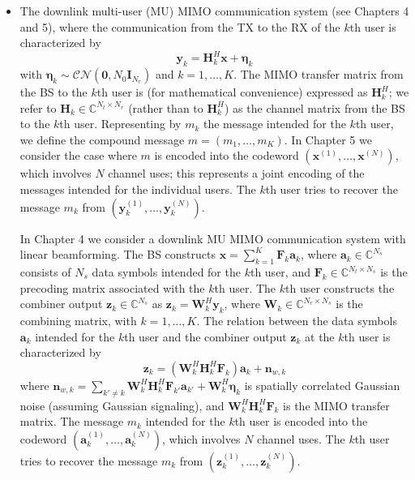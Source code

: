 \documentclass[11pt,a4paper]{report}
\begin{document}
\begin{itemize}
    \item The downlink multi-user (MU) MIMO communication system (see Chapters 4 and 5), where the communication from the TX to the RX of the $k$th user is characterized by
    \begin{equation*}
        \mathbf{y}_k = \mathbf{H}_k^H \mathbf{x} + \boldsymbol{\eta}_k
    \end{equation*}
    with $\boldsymbol{\eta}_k \sim \mathcal{CN}(\mathbf{0}, N_0 \mathbf{I}_{N_r})$ and $k = 1, \dots, K$. The MIMO transfer matrix from the BS to the $k$th user is (for mathematical convenience) expressed as $\mathbf{H}_k^H$; we refer to $\mathbf{H}_k \in \mathbb{C}^{N_t \times N_r}$ (rather than to $\mathbf{H}_k^H$) as the channel matrix from the BS to the $k$th user. Representing by $m_k$ the message intended for the $k$th user, we define the compound message $m = (m_1, \dots, m_K)$. In Chapter 5 we consider the case where $m$ is encoded into the codeword $(\mathbf{x}^{(1)}, \dots, \mathbf{x}^{(N)})$, which involves $N$ channel uses; this represents a joint encoding of the messages intended for the individual users. The $k$th user tries to recover the message $m_k$ from $(\mathbf{y}_k^{(1)}, \dots, \mathbf{y}_k^{(N)})$.

    In Chapter 4 we consider a downlink MU MIMO communication system with linear beamforming. The BS constructs $\mathbf{x} = \sum_{k=1}^K \mathbf{F}_k \mathbf{a}_k$, where $\mathbf{a}_k \in \mathbb{C}^{N_s}$ consists of $N_s$ data symbols intended for the $k$th user, and $\mathbf{F}_k \in \mathbb{C}^{N_t \times N_s}$ is the precoding matrix associated with the $k$th user. The $k$th user constructs the combiner output $\mathbf{z}_k \in \mathbb{C}^{N_s}$ as $\mathbf{z}_k = \mathbf{W}_k^H \mathbf{y}_k$, where $\mathbf{W}_k \in \mathbb{C}^{N_r \times N_s}$ is the combining matrix, with $k = 1, \dots, K$. The relation between the data symbols $\mathbf{a}_k$ intended for the $k$th user and the combiner output $\mathbf{z}_k$ at the $k$th user is characterized by
    \begin{equation*}
        \mathbf{z}_k = (\mathbf{W}_k^H \mathbf{H}_k^H \mathbf{F}_k)\mathbf{a}_k + \mathbf{n}_{w,k}
    \end{equation*}
    where $\mathbf{n}_{w,k} = \sum_{k' \neq k} \mathbf{W}_k^H \mathbf{H}_k^H \mathbf{F}_{k'} \mathbf{a}_{k'} + \mathbf{W}_k^H \boldsymbol{\eta}_k$ is spatially correlated Gaussian noise (assuming Gaussian signaling), and $\mathbf{W}_k^H \mathbf{H}_k^H \mathbf{F}_k$ is the MIMO transfer matrix. The message $m_k$ intended for the $k$th user is encoded into the codeword $(\mathbf{a}_k^{(1)}, \dots, \mathbf{a}_k^{(N)})$, which involves $N$ channel uses. The $k$th user tries to recover the message $m_k$ from $(\mathbf{z}_k^{(1)}, \dots, \mathbf{z}_k^{(N)})$.


\end{itemize}
\end{document}
